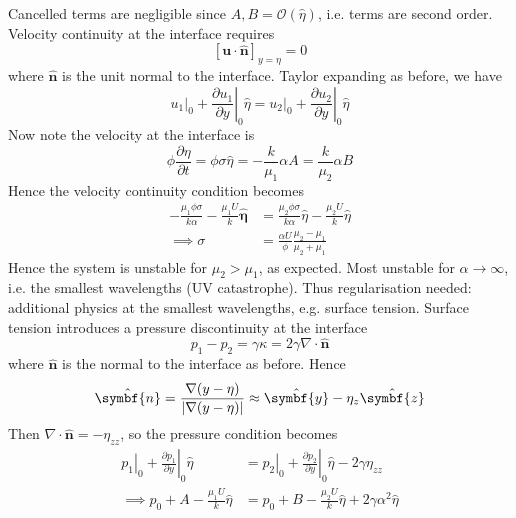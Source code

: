 \documentclass{jknotes}
\renewcommand{\u}{\symbf{u}}
\begin{document}
Cancelled terms are negligible since $A, B = \mathcal{O}(\hat{\eta})$, i.e. 
terms are second order. Velocity continuity at the interface requires
\begin{equation}
	\left[\u \cdot \hat{\symbf{n}}\right]_{y=\eta} = 0 
\end{equation}
where $\hat{\symbf{n}}$ is the unit normal to the interface.  Taylor expanding
as before, we have
\begin{equation}
	\left.u_1\right|_0 + \left. \frac{\partial u_1}{\partial y}\right|_0
	\hat{\eta} = \left.u_2\right|_0 + \left. \frac{\partial
	u_2}{\partial y} \right|_0 \hat{\eta}
\end{equation}
Now note the velocity at the interface is
\begin{equation}
	\phi \frac{\partial \eta}{\partial t} = \phi \sigma \hat{\eta} =
	-\frac{k}{\mu_1} \alpha A = \frac{k}{\mu_2}\alpha B
\end{equation}
Hence the velocity continuity condition becomes
\begin{align}
	-\frac{\mu_1 \phi \sigma}{k \alpha} - \frac{\mu_1 U}{k}\hat{\symbf{\eta}}
	&= \frac{\mu_2 \phi \sigma}{k \alpha} \hat{\eta} - \frac{\mu_2
	U}{k}\hat{\eta}  \\
	\implies \sigma &= \frac{\alpha U}{\phi} \frac{\mu_2 - \mu_1}{\mu_2 + 
	\mu_1}
\end{align}
Hence the system is unstable for $\mu_2 > \mu_1$, as expected. Most unstable
for $\alpha \to \infty$, i.e. the smallest wavelengths (UV catastrophe).
Thus regularisation needed: additional physics at the smallest wavelengths,
e.g. surface tension. Surface tension introduces a pressure discontinuity at
the interface
\begin{equation}
	p_1 - p_2 = \gamma \kappa = 2\gamma \nabla \cdot \hat{\symbf{n}}
\end{equation}
where $\hat{\symbf{n}}$ is the normal to the interface as before. Hence
\begin{equation}
	\hat{\symbf{n}} = \frac{\nabla (y-\eta)}{\abs{\nabla(y-\eta)}} \approx
	\hat{\symbf{y}} - \eta_z \hat{\symbf{z}}
\end{equation}
Then $\nabla \cdot \symbf{\hat{n}} = -\eta_{zz}$, so the pressure condition
becomes
\begin{align}
	\left.p_1 \right|_0 + \left. \frac{\partial p_1}{\partial
y}\right|_0 \hat{\eta} &= \left.p_2 \right|_0 + \left. \frac{\partial p_2}{\partial
y}\right|_0 \hat{\eta} -2\gamma \eta_{zz} \\
\implies p_0 + A - \frac{\mu_1 U}{k}\hat{\eta} &= p_0 + B - \frac{\mu_2
U}{k}\hat{\eta} + 2\gamma \alpha^2 \hat{\eta}
\end{align}
\end{document}
